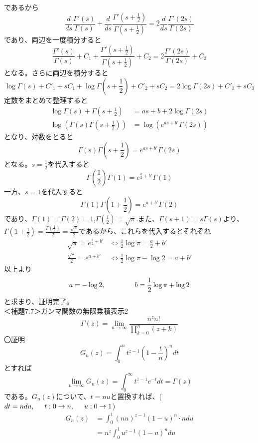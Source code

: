 \documentclass{jsarticle}
\begin{document}
であるから
\[\frac{d}{ds}\frac{\Gamma'(s)}{\Gamma(s)}+\frac{d}{ds}\frac{\Gamma'\left(s+\frac{1}{2}\right)}{\Gamma\left(s+\frac{1}{2}\right)}=2\frac{d}{ds}\frac{\Gamma'(2s)}{\Gamma(2s)}\]
であり、両辺を一度積分すると
\[\frac{\Gamma'(s)}{\Gamma(s)}+C_{1}+\frac{\Gamma'\left(s+\frac{1}{2}\right)}{\Gamma\left(s+\frac{1}{2}\right)}+C_{2}=2\frac{\Gamma'(2s)}{\Gamma(2s)}+C_{3}\]
となる。さらに両辺を積分すると
\[\log\Gamma(s)+C'_{1}+sC_{1}+\log\Gamma\left(s+\frac{1}{2}\right)+C'_{2}+sC_{2}=2\log\Gamma(2s)+C'_{3}+sC_{3}\]
定数をまとめて整理すると
\begin{align*}
\log\Gamma(s)+\Gamma\left(s+\frac{1}{2}\right)&=as+b+2\log\Gamma(2s)\\
\log\left(\Gamma(s)\Gamma\left(s+\frac{1}{2}\right)\right)&=\log\left(e^{as+b'}\Gamma(2s)\right)
\end{align*}
となり、対数をとると
\[\Gamma(s)\Gamma\left(s+\frac{1}{2}\right)=e^{as+b'}\Gamma(2s)\]
となる。\(s=\frac{1}{2}\)を代入すると
\[\Gamma\left(\frac{1}{2}\right)\Gamma(1)=e^{\frac{a}{2}+b'}\Gamma(1)\]
一方、\(s=1\)を代入すると
\[\Gamma(1)\Gamma\left(1+\frac{1}{2}\right)=e^{a+b'}\Gamma(2)\]
であり、\(\Gamma(1)=\Gamma(2)=1\),\(\Gamma\left(\frac{1}{2}\right)=\sqrt{\pi}\).また、\(\Gamma(s+1)=s\Gamma(s)\)より、\(\Gamma\left(1+\frac{1}{2}\right)=\frac{\Gamma\left(\frac{1}{2}\right)}{2}=\frac{\sqrt{\pi}}{2}\)であるから、これらを代入するとそれぞれ
\begin{align*}
\sqrt{\pi}=e^{\frac{a}{2}+b'}&\Longleftrightarrow\frac{1}{2}\log\pi=\frac{a}{2}+b'\\
\frac{\sqrt{\pi}}{2}=e^{a+b'}&\Longleftrightarrow\frac{1}{2}\log\pi-\log2=a+b'
\end{align*}
以上より
\[a=-\log2,\hspace{15mm}b=\frac{1}{2}\log\pi+\log2\]
と求まり、証明完了。\\
＜補題7.7＞ガンマ関数の無限乗積表示2\\
\begin{equation}
\Gamma(z)=\lim_{n\to\infty}\frac{n^{z}n!}{\prod_{k=0}^{n}(z+k)}
\end{equation}
〇証明\\
\[G_{n}(z)=\int_{0}^{n}t^{z-1}\left(1-\frac{t}{n}\right)^{n}dt\]
とすれば
\[\lim_{n\to\infty}G_{n}(z)=\int_{0}^{\infty}t^{z-1}e^{-t}dt=\Gamma(z)\]
である。\(G_{n}(z)\)について、\(t=nu\)と置換すれば、(\(dt=ndu,\hspace{5mm}t:0\to n,\hspace{5mm}u:0\to1\))
\begin{align*}
G_{n}(z)&=\int_{0}^{1}(nu)^{z-1}(1-u)^{n}\cdot ndu\\
&=n^{z}\int_{0}^{1}u^{z-1}(1-u)^{n}du
\end{align*}
\end{document}
